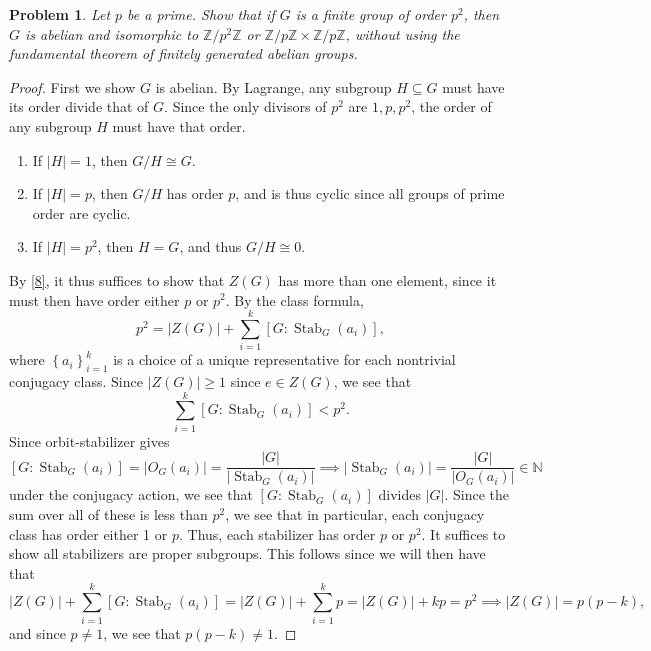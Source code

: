 \documentclass[11pt, letterpaper]{article}
\theoremstyle{plain}
\newtheorem{problem}{Problem}[section]
\begin{document}
\begin{problem}\label{9}
	Let $p$ be a prime. Show that if $G$ is a finite group of order $p^2$, then $G$ is abelian and isomorphic to $\mathbb{Z} /p^2\mathbb{Z} $ or $\mathbb{Z} /p\mathbb{Z} \times \mathbb{Z} /p\mathbb{Z} $, without using the fundamental theorem of finitely generated abelian groups.
\end{problem}
\begin{proof}
	First we show $G$ is abelian. By Lagrange, any subgroup $H\subseteq G$ must have its order divide that of $G$. Since the only divisors of $p^2$ are $1,p,p^2$, the order of any subgroup $H$ must have that order.
	\begin{enumerate}
		\item If $\left| H \right| =1$, then $G/H\cong G$.
		\item If $\left| H \right| =p$, then $G/H$ has order $p$, and is thus cyclic since all groups of prime order are cyclic.
		\item If $\left| H \right| =p^2$, then $H=G$, and thus $G/H\cong 0$.
	\end{enumerate}
	By \cref{8}, it thus suffices to show that $Z(G)$ has more than one element, since it must then have order either $p$ or $p^2$. By the class formula,
	\[
		p^2=\left| Z(G) \right| +\sum_{i=1}^{k} \left[ G : \operatorname{Stab}_G(a_i) \right]  ,
	\]
	where $\left\{ a_i \right\}_{i=1} ^k$ is a choice of a unique representative for each nontrivial conjugacy class. Since $\left| Z(G) \right| \geq 1$ since $e\in Z(G)$, we see that
	\[
		\sum_{i=1}^{k} \left[ G : \operatorname{Stab} _G(a_i) \right] <p^2
	.\]
	Since orbit-stabilizer gives
	\[
		\left[ G : \operatorname{Stab} _G(a_i) \right] = \left| O_G(a_i) \right| =\frac{\left| G \right| }{\left| \operatorname{Stab} _G(a_i) \right| } \implies \left| \operatorname{Stab} _G(a_i) \right| =\frac{\left| G \right| }{\left| O_G(a_i) \right| } \in\mathbb{N} 
	\]
	under the conjugacy action, we see that $\left[ G : \operatorname{Stab} _G(a_i) \right] $ divides $\left| G \right| $. Since the sum over all of these is less than $p^2$, we see that in particular, each conjugacy class has order either 1 or $p$. Thus, each stabilizer has order $p$ or $p^2$. It suffices to show all stabilizers are proper subgroups. This follows since we will then have that
	\[
		\left| Z(G) \right| +\sum_{i=1}^{k} \left[ G : \operatorname{Stab} _G(a_i) \right] =\left| Z(G) \right| +\sum_{i=1}^{k} p=\left| Z(G) \right| +kp = p^2 \implies \left| Z(G) \right| =p(p-k),
	\]
	and since $p\neq 1$, we see that $p(p-k)\neq 1$.


\end{proof}
\end{document}

